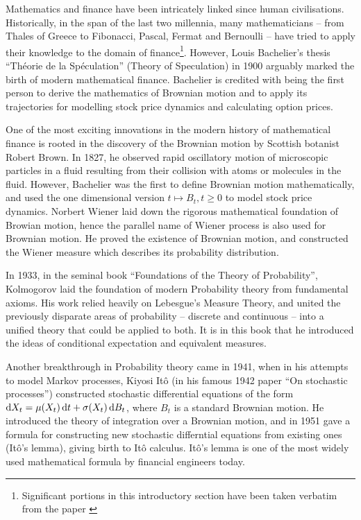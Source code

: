 

Mathematics and finance have been intricately linked since human civilisations. Historically, in the span of the last two millennia, many mathematicians -- from Thales of Greece to Fibonacci, Pascal, Fermat and Bernoulli -- have tried to apply their knowledge to the domain of finance\footnote{Significant portions in this introductory section have been taken verbatim from the paper \cite{Akyildirim2014}}. However, Louis Bachelier's thesis “Théorie de la Spéculation” (Theory of Speculation) in 1900 arguably marked the birth of modern mathematical finance. Bachelier is credited with being the first person to derive the mathematics of Brownian motion and to apply its trajectories for modelling stock price dynamics and calculating option prices.

One of the most exciting innovations in the modern history of mathematical finance is rooted in the discovery of the Brownian motion by Scottish botanist Robert Brown. In 1827, he observed rapid oscillatory motion of microscopic particles in a fluid resulting from their collision with atoms or molecules in the fluid. However, Bachelier was the first to define Brownian motion mathematically, and used the one dimensional version $ t \mapsto B_t, t \ge 0 $ to model stock price dynamics. Norbert Wiener laid down the rigorous mathematical foundation of Browian motion, hence the parallel name of Wiener process is also used for Brownian motion. He proved the existence of Brownian motion, and constructed the Wiener measure which describes its probability distribution.

In 1933, in the seminal book “Foundations of the Theory of Probability”, Kolmogorov laid the foundation of modern Probability theory from fundamental axioms. His work relied heavily on Lebesgue's Measure Theory, and united the previously disparate areas of probability -- discrete and continuous -- into a unified theory that could be applied to both. It is in this book that he introduced the ideas of conditional expectation and equivalent measures.

Another breakthrough in Probability theory came in 1941, when in his attempts to model Markov processes, Kiyosi Itô (in his famous 1942 paper “On stochastic processes”) constructed stochastic differential equations of the form $ \dif X_t = \mu(X_t) \dif t + \sigma(X_t) \dif B_t $, where $ B_t $ is a standard Brownian motion. He introduced the theory of integration over a Brownian motion, and in 1951 gave a formula for constructing new stochastic differntial equations from existing ones (Itô's lemma), giving birth to Itô calculus. Itô's lemma is one of the most widely used mathematical formula by financial engineers today.


